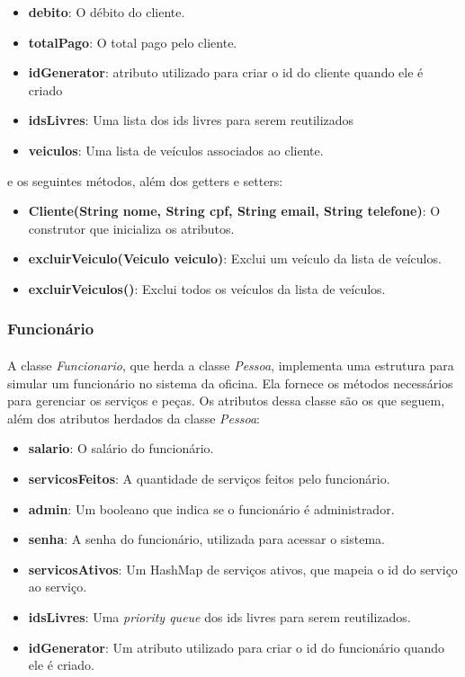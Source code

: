 \documentclass[a4paper,12pt]{article}
\begin{document}
\begin{itemize}[noitemsep]
    \item \textbf{debito}: O débito do cliente.
    \item \textbf{totalPago}: O total pago pelo cliente.
    \item \textbf{idGenerator}: atributo utilizado para criar o id do cliente quando ele é criado
    \item \textbf{idsLivres}: Uma lista dos ids livres para serem reutilizados
    \item \textbf{veiculos}: Uma lista de veículos associados ao cliente.
\end{itemize}

\noindent e os seguintes métodos, além dos getters e setters:

\begin{itemize}[noitemsep]
    \item \textbf{Cliente(String nome, String cpf, String email, String telefone)}: O construtor que inicializa os atributos.
    \item \textbf{excluirVeiculo(Veiculo veiculo)}: Exclui um veículo da lista de veículos.
    \item \textbf{excluirVeiculos()}: Exclui todos os veículos da lista de veículos.
\end{itemize}

\subsubsection{Funcionário}
\paragraph{}
A classe \textit{Funcionario}, que herda a classe \textit{Pessoa}, implementa uma estrutura para simular um funcionário no sistema da oficina. Ela fornece os métodos necessários para gerenciar os serviços e peças. Os atributos dessa classe são os que seguem, além dos atributos herdados da classe \textit{Pessoa}:

\begin{itemize}[noitemsep]
    \item \textbf{salario}: O salário do funcionário.
    \item \textbf{servicosFeitos}: A quantidade de serviços feitos pelo funcionário.
    \item \textbf{admin}: Um booleano que indica se o funcionário é administrador.
    \item \textbf{senha}: A senha do funcionário, utilizada para acessar o sistema.
    \item \textbf{servicosAtivos}: Um HashMap de serviços ativos, que mapeia o id do serviço ao serviço.
    \item \textbf{idsLivres}: Uma \textit{priority queue} dos ids livres para serem reutilizados.
    \item \textbf{idGenerator}: Um atributo utilizado para criar o id do funcionário quando ele é criado.
\end{itemize}
\end{document}
